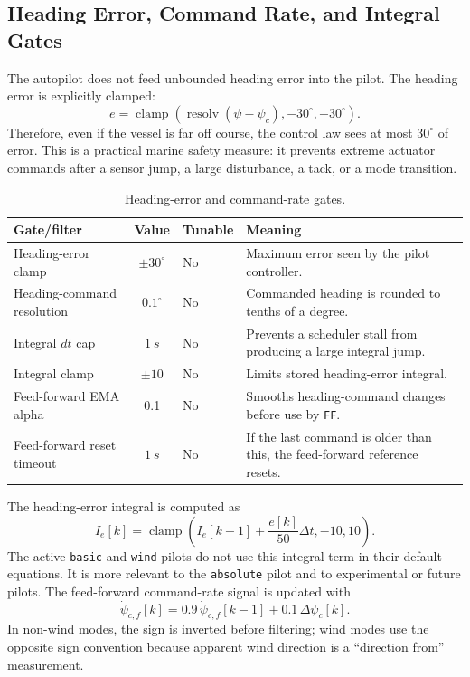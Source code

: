 \documentclass[10pt,twocolumn]{article}
\begin{document}
\subsection{Heading Error, Command Rate, and Integral Gates}
The autopilot does not feed unbounded heading error into the pilot.  The
heading error is explicitly clamped:
\[
e
=
\operatorname{clamp}
\left(
\operatorname{resolv}(\psi-\psi_c),
-30^\circ,
+30^\circ
\right).
\]
Therefore, even if the vessel is far off course, the control law sees at
most \(30^\circ\) of error.  This is a practical marine safety measure:
it prevents extreme actuator commands after a sensor jump, a large
disturbance, a tack, or a mode transition.
\begin{table}[!t]
\centering
\caption{Heading-error and command-rate gates.}
\label{tab:pypilot-heading-gates}
\begin{tabularx}{\columnwidth}{Z{0.26\columnwidth}cZ{0.14\columnwidth}Y}
\toprule
Gate/filter & Value & Tunable & Meaning \\
\midrule
Heading-error clamp &
\(\pm 30^\circ\) &
No &
Maximum error seen by the pilot controller. \\
Heading-command resolution &
\(\num{0.1}^\circ\) &
No &
Commanded heading is rounded to tenths of a degree. \\
Integral \(dt\) cap &
\(\SI{1}{s}\) &
No &
Prevents a scheduler stall from producing a large integral jump. \\
Integral clamp &
\(\pm 10\) &
No &
Limits stored heading-error integral. \\
Feed-forward EMA alpha &
\num{0.1} &
No &
Smooths heading-command changes before use by \texttt{FF}. \\
Feed-forward reset timeout &
\(\SI{1}{s}\) &
No &
If the last command is older than this, the feed-forward reference resets. \\
\bottomrule
\end{tabularx}
\end{table}
The heading-error integral is computed as
\[
I_e[k]
=
\operatorname{clamp}
\left(
I_e[k-1]
+
\frac{e[k]}{50}\Delta t,
-10,
10
\right).
\]
The active \texttt{basic} and \texttt{wind} pilots do not use this
integral term in their default equations.  It is more relevant to the
\texttt{absolute} pilot and to experimental or future pilots.
The feed-forward command-rate signal is updated with
\[
\dot{\psi}_{c,f}[k]
=
0.9\,\dot{\psi}_{c,f}[k-1]
+
0.1\,\Delta\psi_c[k].
\]
In non-wind modes, the sign is inverted before filtering; wind modes use
the opposite sign convention because apparent wind direction is a
``direction from'' measurement.
\end{document}
